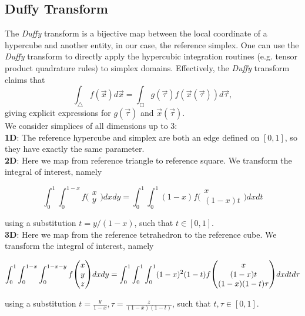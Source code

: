 \subsection{Duffy Transform}
\label{section-abstract-duffy-transform}

The \textit{Duffy} transform is a bijective map between the local coordinate of a hypercube and another entity, in our case, the reference simplex. One can use the \textit{Duffy} transform to directly apply the hypercubic integration routines (e.g. tensor product quadrature rules) to simplex domains. Effectively, the \textit{Duffy} transform claims that
\[\int_{\triangle} f(\vec{x}) d\vec{x} = \int_{\Box} g(\vec{\tau}) f(\vec{x}(\vec{\tau})) d\vec{\tau},\]
giving explicit expressions for $g(\vec{\tau})$ and $\vec{x}(\vec{\tau})$. \\

\noindent
We consider simplices of all dimensions up to 3: \\

\noindent
\textbf{1D}: The reference hypercube and simplex are both an edge defined on $[0, 1]$, so they have exactly the same parameter. \\

\noindent
\textbf{2D}: Here we map from reference triangle to reference square. We transform the integral of interest, namely

\[ \int_0^1 \int_0^{1-x} f \biggl(
\begin{matrix}  x \\ y  \end{matrix} \biggr)
 dx dy = \int_0^1 \int_0^1 (1-x) 
f \biggl( \begin{matrix} x \\ (1-x)t \end{matrix} \biggr)
dx dt \]

\noindent
using a substitution $t = y / (1 - x)$, such that $t \in [0, 1]$. \\

\noindent
\textbf{3D}: Here we map from the reference tetrahedron to the reference cube. We transform the integral of interest, namely

\[ \int_0^1 \int_0^{1-x} \int_0^{1-x-y} f \scalebox{1.2}{\Bigg(}
\begin{matrix}  x \\ y \\ z  \end{matrix} \scalebox{1.2}{\Bigg)}
dx dy = \int_0^1 \int_0^1 \int_0^1 (1-x)^2 (1-t)
f \scalebox{1.2}{\Bigg(} \begin{matrix}  x \\ (1-x)t \\ (1-x)(1-t)\tau  \end{matrix} \scalebox{1.2}{\Bigg)}
dx dt d\tau \]

\noindent
using a substitution $t = \frac{y}{1 - x}, \tau = \frac{z}{(1 - x)(1 - t)}$, such that $t,\tau \in [0, 1]$. \\